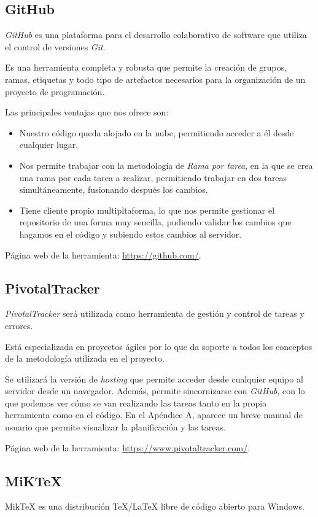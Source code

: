\subsection{GitHub}
\textit{GitHub} es una plataforma para el desarrollo colaborativo de software que utiliza el control de versiones \textit{Git}.

Es una herramienta completa y robusta que permite la creación de grupos, ramas, etiquetas y todo tipo de artefactos necesarios para la organización de un proyecto de programación.

Las principales ventajas que nos ofrece son:
\begin{itemize}
\item Nuestro código queda alojado en la nube, permitiendo acceder a él desde cualquier lugar.
\item Nos permite trabajar con la metodología de \textit{Rama por tarea}, en la que se crea una rama por cada tarea a realizar, permitiendo trabajar en dos tareas simultáneamente, fusionando después los cambios.
\item Tiene cliente propio multipltaforma, lo que nos permite gestionar el repositorio de una forma muy sencilla, pudiendo validar los cambios que hagamos en el código y subiendo estos cambios al servidor.
\end{itemize}

Página web de la herramienta: \url{https://github.com/}.


\subsection{PivotalTracker}
\textit{PivotalTracker} será utilizada como herramienta de gestión y control de tareas y errores.

Está especializada en proyectos ágiles por lo que da soporte a todos los conceptos de la metodología \scrum{} utilizada en el proyecto.

Se utilizará la versión de \textit{hosting} que permite acceder desde cualquier equipo al servidor desde un navegador. Además, permite sincornizarse con \textit{GitHub}, con lo que podemos ver cómo se van realizando las tareas tanto en la propia herramienta como en el código. En el Apéndice A, aparece un breve manual de usuario que permite visualizar la planificación y las tareas.

Página web de la herramienta: \url{https://www.pivotaltracker.com/}.


\subsection{MiK\TeX{}}
Mik\TeX{} es una distribución \TeX{}/\LaTeX{} libre de código abierto para Windows.

